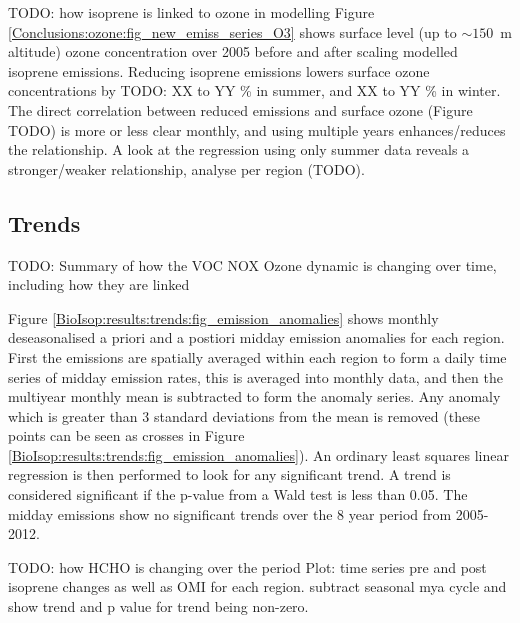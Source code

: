     TODO: how isoprene is linked to ozone in modelling 
    Figure \ref{Conclusions:ozone:fig_new_emiss_series_O3} shows surface level (up to $\sim 150$~m altitude) ozone concentration over 2005 before and after scaling modelled isoprene emissions.
    Reducing isoprene emissions lowers surface ozone concentrations by TODO: XX to YY \% in summer, and XX to YY \% in winter.
    The direct correlation between reduced emissions and surface ozone (Figure TODO) is more or less clear monthly, and using multiple years enhances/reduces the relationship.
    A look at the regression using only summer data reveals a stronger/weaker relationship, analyse per region (TODO).
  
  \subsection{Trends}
    \label{BioIsop:results:trends}
    
    TODO: Summary of how the VOC NOX Ozone dynamic is changing over time, including how they are linked
    
    
    Figure \ref{BioIsop:results:trends:fig_emission_anomalies} shows monthly deseasonalised a priori and a postiori midday emission anomalies for each region.
    First the emissions are spatially averaged within each region to form a daily time series of midday emission rates, this is averaged into monthly data, and then the multiyear monthly mean is subtracted to form the anomaly series.
    Any anomaly which is greater than 3 standard deviations from the mean is removed (these points can be seen as crosses in Figure \ref{BioIsop:results:trends:fig_emission_anomalies}).
    An ordinary least squares linear regression is then performed to look for any significant trend.
    A trend is considered significant if the p-value from a Wald test is less than 0.05.
    The midday emissions show no significant trends over the 8 year period from 2005-2012.
    
      
    
    TODO: how HCHO is changing over the period
    Plot: time series pre and post isoprene changes as well as OMI for each region.
    subtract seasonal mya cycle and show trend and p value for trend being non-zero.
    
